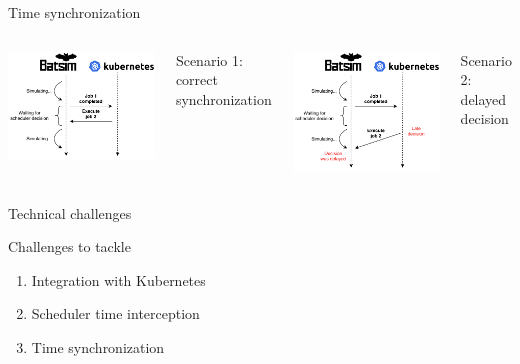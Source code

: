 \documentclass[12pt, aspectratio=43]{beamer}
\begin{document}
\begin{frame}{Time synchronization}
	\begin{columns}
		\includegraphics[scale=0.65]{../imgs/time-sync-correct.pdf}

		\small{Scenario 1: correct synchronization}

		\includegraphics[scale=0.6]{../imgs/time-sync-delayed.pdf}

		\small{Scenario 2: delayed decision}
	\end{columns}
\end{frame}

\begin{frame}{Technical challenges}
	\begin{alertblock}{Challenges to tackle}
		\begin{enumerate}
			\item Integration with Kubernetes
			\item Scheduler time interception
			\item Time synchronization
		\end{enumerate}
	\end{alertblock}
\end{frame}
\end{document}
